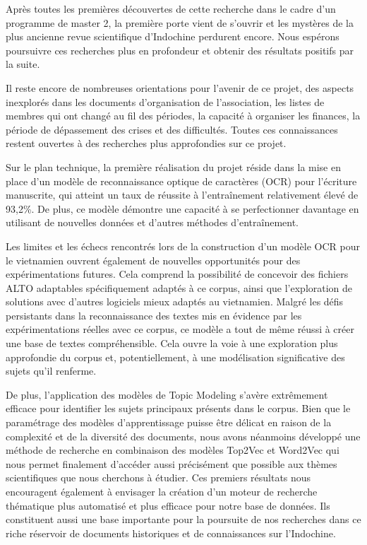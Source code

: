 Après toutes les premières découvertes de cette recherche dans le cadre d'un programme de master 2, la première porte vient de s'ouvrir et les mystères de la plus ancienne revue scientifique d'Indochine perdurent encore. Nous espérons poursuivre ces recherches plus en profondeur et obtenir des résultats positifs par la suite.

Il reste encore de nombreuses orientations pour l'avenir de ce projet, des aspects inexplorés dans les documents d'organisation de l'association, les listes de membres qui ont changé au fil des périodes, la capacité à organiser les finances, la période de dépassement des crises et des difficultés. Toutes ces connaissances restent ouvertes à des recherches plus approfondies sur ce projet.

Sur le plan technique, la première réalisation du projet réside dans la mise en place d'un modèle de reconnaissance optique de caractères (OCR) pour l'écriture manuscrite, qui atteint un taux de réussite à l'entraînement relativement élevé de 93,2\%. De plus, ce modèle démontre une capacité à se perfectionner davantage en utilisant de nouvelles données et d'autres méthodes d'entraînement. 

Les limites et les échecs rencontrés lors de la construction d'un modèle OCR pour le vietnamien ouvrent également de nouvelles opportunités pour des expérimentations futures. Cela comprend la possibilité de concevoir des fichiers ALTO adaptables spécifiquement adaptés à ce corpus, ainsi que l'exploration de solutions avec d'autres logiciels mieux adaptés au vietnamien. Malgré les défis persistants dans la reconnaissance des textes mis en évidence par les expérimentations réelles avec ce corpus, ce modèle a tout de même réussi à créer une base de textes compréhensible. Cela ouvre la voie à une exploration plus approfondie du corpus et, potentiellement, à une modélisation significative des sujets qu'il renferme.

De plus, l'application des modèles de Topic Modeling s'avère extrêmement efficace pour identifier les sujets principaux présents dans le corpus. Bien que le paramétrage des modèles d'apprentissage puisse être délicat en raison de la complexité et de la diversité des documents, nous avons néanmoins développé une méthode de recherche en combinaison des modèles Top2Vec et Word2Vec qui nous permet finalement d'accéder aussi précisément que possible aux thèmes scientifiques que nous cherchons à étudier. Ces premiers résultats nous encouragent également à envisager la création d'un moteur de recherche thématique plus automatisé et plus efficace pour notre base de données. Ils constituent aussi une base importante pour la poursuite de nos recherches dans ce riche réservoir de documents historiques et de connaissances sur l'Indochine.
